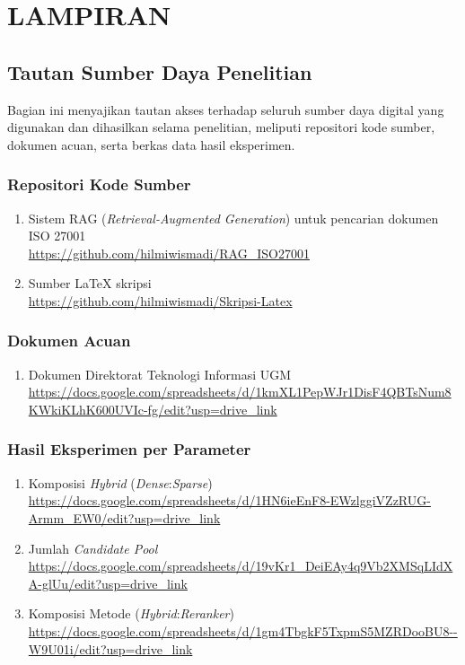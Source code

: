 \chapter*{LAMPIRAN}

\section{Tautan Sumber Daya Penelitian}

Bagian ini menyajikan tautan akses terhadap seluruh sumber daya digital yang digunakan dan dihasilkan selama penelitian, meliputi repositori kode sumber, dokumen acuan, serta berkas data hasil eksperimen.

\subsection*{Repositori Kode Sumber}

\begin{enumerate}
	\item Sistem RAG (\textit{Retrieval-Augmented Generation}) untuk pencarian dokumen ISO 27001\\
	\url{https://github.com/hilmiwismadi/RAG_ISO27001}
	\item Sumber LaTeX skripsi\\
	\url{https://github.com/hilmiwismadi/Skripsi-Latex}
\end{enumerate}

\subsection*{Dokumen Acuan}

\begin{enumerate}
	\item Dokumen Direktorat Teknologi Informasi UGM\\
	\url{https://docs.google.com/spreadsheets/d/1kmXL1PepWJr1DisF4QBTsNum8KWkiKLhK600UVIc-fg/edit?usp=drive_link}
\end{enumerate}

\subsection*{Hasil Eksperimen per Parameter}

\begin{enumerate}
	\item Komposisi \textit{Hybrid} (\textit{Dense}:\textit{Sparse})\\
	\url{https://docs.google.com/spreadsheets/d/1HN6ieEnF8-EWzlggiVZzRUG-Armm_EW0/edit?usp=drive_link}
	\item Jumlah \textit{Candidate Pool}\\
	\url{https://docs.google.com/spreadsheets/d/19vKr1_DeiEAy4q9Vb2XMSqLIdXA-glUu/edit?usp=drive_link}
	\item Komposisi Metode (\textit{Hybrid}:\textit{Reranker})\\
	\url{https://docs.google.com/spreadsheets/d/1gm4TbgkF5TxpmS5MZRDooBU8--W9U01i/edit?usp=drive_link}
\end{enumerate}

